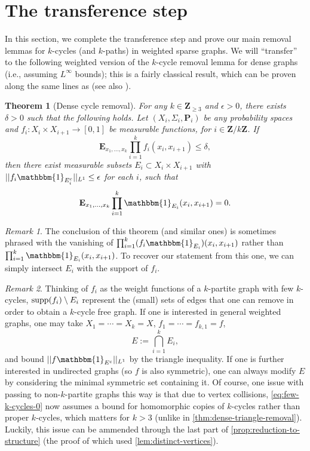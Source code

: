 \documentclass[reqno,11pt]{amsart}
\newtheorem{knowntheorem}{Theorem}
\theoremstyle{definition}
\theoremstyle{remark}
\newtheorem*{remark}{Remark}
\numberwithin{equation}{section}
\newcommand{\Z}{\mathbf{Z}}
\renewcommand{\P}{\mathbf{P}}
\newcommand{\E}{\mathbf{E}}
\newcommand{\one}{\mathbbm{1}}
\newcommand{\supp}{\textnormal{supp}}
\begin{document}
\section{The transference step} \label{sec:transference}

In this section, we complete the transference step and prove our main removal lemmas for $k$-cycles (and $k$-paths) in weighted sparse graphs. We will ``transfer'' to the following weighted version of the $k$-cycle removal lemma for dense graphs (i.e., assuming $L^\infty$ bounds); this is a fairly classical result, which can be proven along the same lines as \cite[Theorem 4.1]{conlon2021regularity} (see also \cite{tao2007ergodic}).

\begin{knowntheorem}[Dense cycle removal] \label{thm:dense-k-cycle-removal}
For any $k \in \Z_{\ge 3}$ and $\epsilon > 0$, there exists $\delta > 0$ such that the following holds. Let $(X_i, \Sigma_i, \P_i)$ be any probability spaces and $f_{i} : X_i \times X_{i+1} \to [0, 1]$ be measurable functions, for $i \in \Z/k\Z$. If
\begin{equation} \label{eq:few-k-cycles-0}
    \E_{x_1,\ldots,x_k} \prod_{i=1}^k f_{i}(x_i, x_{i+1}) \le \delta,
\end{equation}
then there exist measurable subsets $E_{i} \subset X_i \times X_{i+1}$ with $||f_{i} \one_{E_{i}^c}||_{L^1} \le \epsilon$ for each $i$, such that
\[
    \E_{x_1,\ldots, x_k} \prod_{i=1}^k \one_{E_{i}}(x_i, x_{i+1}) = 0.
\]
\end{knowntheorem}

\begin{remark}
The conclusion of this theorem (and similar ones) is sometimes \cite{tao2007ergodic} phrased with the vanishing of $\prod_{i=1}^k (f_i\one_{E_i})(x_i, x_{i+1})$ rather than $\prod_{i=1}^k \one_{E_i}(x_i, x_{i+1})$. To recover our statement from this one, we can simply intersect $E_i$ with the support of $f_i$.
\end{remark}

\begin{remark}
Thinking of $f_{i}$ as the weight functions of a $k$-partite graph with few $k$-cycles, $\supp(f_i) \setminus E_{i}$ represent the (small) sets of edges that one can remove in order to obtain a $k$-cycle free graph. If one is interested in general weighted graphs, one may take $X_1 = \cdots = X_k = X$, $f_{1} = \cdots = f_{k,1} = f$,
\[
    E := \bigcap_{i=1}^k E_{i},
\]
and bound $||f \one_{E^c}||_{L^1}$ by the triangle inequality.
If one is further interested in undirected graphs (so $f$ is also symmetric), one can always modify $E$ by considering the minimal symmetric set containing it. Of course, one issue with passing to non-$k$-partite graphs this way is that due to vertex collisions, \cref{eq:few-k-cycles-0} now assumes a bound for homomorphic copies of $k$-cycles rather than proper $k$-cycles, which matters for $k > 3$ (unlike in \cref{thm:dense-triangle-removal}). Luckily, this issue can be ammended through the last part of \cref{prop:reduction-to-structure} (the proof of which used \cref{lem:distinct-vertices}).
\end{remark}
\end{document}
